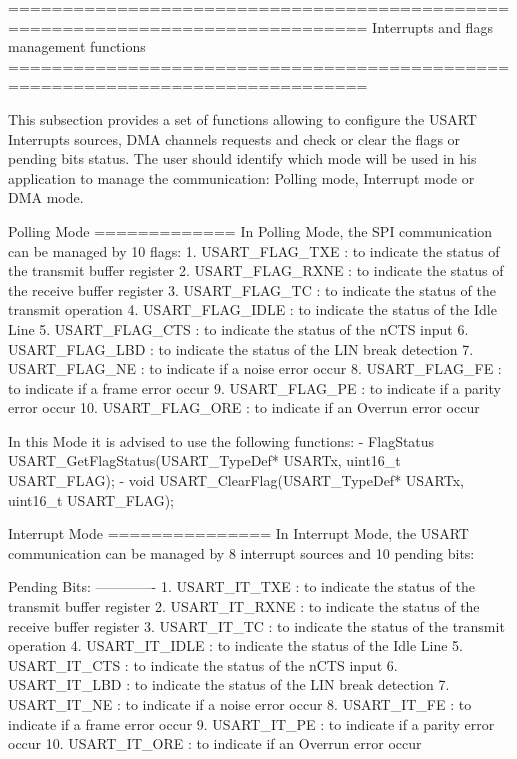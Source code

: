 \begin{DoxyVerb} ===============================================================================
                   Interrupts and flags management functions
 ===============================================================================  

  This subsection provides a set of functions allowing to configure the USART 
  Interrupts sources, DMA channels requests and check or clear the flags or 
  pending bits status.
  The user should identify which mode will be used in his application to manage 
  the communication: Polling mode, Interrupt mode or DMA mode. 
    
  Polling Mode
  =============
  In Polling Mode, the SPI communication can be managed by 10 flags:
     1. USART_FLAG_TXE : to indicate the status of the transmit buffer register
     2. USART_FLAG_RXNE : to indicate the status of the receive buffer register
     3. USART_FLAG_TC : to indicate the status of the transmit operation
     4. USART_FLAG_IDLE : to indicate the status of the Idle Line             
     5. USART_FLAG_CTS : to indicate the status of the nCTS input
     6. USART_FLAG_LBD : to indicate the status of the LIN break detection
     7. USART_FLAG_NE : to indicate if a noise error occur
     8. USART_FLAG_FE : to indicate if a frame error occur
     9. USART_FLAG_PE : to indicate if a parity error occur
     10. USART_FLAG_ORE : to indicate if an Overrun error occur

  In this Mode it is advised to use the following functions:
      - FlagStatus USART_GetFlagStatus(USART_TypeDef* USARTx, uint16_t USART_FLAG);
      - void USART_ClearFlag(USART_TypeDef* USARTx, uint16_t USART_FLAG);

  Interrupt Mode
  ===============
  In Interrupt Mode, the USART communication can be managed by 8 interrupt sources
  and 10 pending bits: 

  Pending Bits:
  ------------- 
     1. USART_IT_TXE : to indicate the status of the transmit buffer register
     2. USART_IT_RXNE : to indicate the status of the receive buffer register
     3. USART_IT_TC : to indicate the status of the transmit operation
     4. USART_IT_IDLE : to indicate the status of the Idle Line             
     5. USART_IT_CTS : to indicate the status of the nCTS input
     6. USART_IT_LBD : to indicate the status of the LIN break detection
     7. USART_IT_NE : to indicate if a noise error occur
     8. USART_IT_FE : to indicate if a frame error occur
     9. USART_IT_PE : to indicate if a parity error occur
     10. USART_IT_ORE : to indicate if an Overrun error occur


\end{DoxyVerb}
